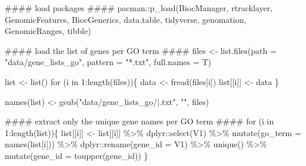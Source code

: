 \documentclass[
  letterpaper,
  DIV=11,
  numbers=noendperiod]{scrreprt}
\newenvironment{Shaded}{}{}
\newcommand{\AttributeTok}[1]{\textcolor[rgb]{0.84,0.23,0.29}{#1}}
\newcommand{\ControlFlowTok}[1]{\textcolor[rgb]{0.84,0.23,0.29}{#1}}
\newcommand{\DecValTok}[1]{\textcolor[rgb]{0.00,0.36,0.77}{#1}}
\newcommand{\DocumentationTok}[1]{\textcolor[rgb]{0.42,0.45,0.49}{#1}}
\newcommand{\FunctionTok}[1]{\textcolor[rgb]{0.44,0.26,0.76}{#1}}
\newcommand{\NormalTok}[1]{\textcolor[rgb]{0.14,0.16,0.18}{#1}}
\newcommand{\OtherTok}[1]{\textcolor[rgb]{0.44,0.26,0.76}{#1}}
\newcommand{\SpecialCharTok}[1]{\textcolor[rgb]{0.00,0.36,0.77}{#1}}
\newcommand{\StringTok}[1]{\textcolor[rgb]{0.01,0.18,0.38}{#1}}
\begin{document}
\begin{Shaded}
\begin{Highlighting}[]
\DocumentationTok{\#\#\#\# load packages \#\#\#\#}
\NormalTok{pacman}\SpecialCharTok{::}\FunctionTok{p\_load}\NormalTok{(BiocManager, rtracklayer, GenomicFeatures, BiocGenerics, data.table, tidyverse, genomation, GenomicRanges, tibble)}

\DocumentationTok{\#\#\#\# load the list of genes per GO term \#\#\#\#}
\NormalTok{files }\OtherTok{\textless{}{-}} \FunctionTok{list.files}\NormalTok{(}\AttributeTok{path =} \StringTok{"data/gene\_lists\_go"}\NormalTok{, }\AttributeTok{pattern =} \StringTok{"*.txt"}\NormalTok{, }\AttributeTok{full.names =}\NormalTok{ T)}

\NormalTok{list }\OtherTok{\textless{}{-}} \FunctionTok{list}\NormalTok{()}
\ControlFlowTok{for}\NormalTok{ (i }\ControlFlowTok{in} \DecValTok{1}\SpecialCharTok{:}\FunctionTok{length}\NormalTok{(files))\{}
\NormalTok{  data }\OtherTok{\textless{}{-}} \FunctionTok{fread}\NormalTok{(files[i])}
\NormalTok{  list[[i]] }\OtherTok{\textless{}{-}}\NormalTok{ data}
\NormalTok{\}}

\FunctionTok{names}\NormalTok{(list) }\OtherTok{\textless{}{-}} \FunctionTok{gsub}\NormalTok{(}\StringTok{"data/gene\_lists\_go/|.txt"}\NormalTok{, }\StringTok{""}\NormalTok{, files)}

\DocumentationTok{\#\#\#\# extract only the unique gene names per GO term \#\#\#\#}
\ControlFlowTok{for}\NormalTok{ (i }\ControlFlowTok{in} \DecValTok{1}\SpecialCharTok{:}\FunctionTok{length}\NormalTok{(list))\{}
\NormalTok{  list[[i]] }\OtherTok{\textless{}{-}}\NormalTok{ list[[i]] }\SpecialCharTok{\%\textgreater{}\%}\NormalTok{ dplyr}\SpecialCharTok{::}\FunctionTok{select}\NormalTok{(}\StringTok{\textasciigrave{}}\AttributeTok{V1}\StringTok{\textasciigrave{}}\NormalTok{) }\SpecialCharTok{\%\textgreater{}\%}
    \FunctionTok{mutate}\NormalTok{(}\AttributeTok{go\_term =} \FunctionTok{names}\NormalTok{(list[i])) }\SpecialCharTok{\%\textgreater{}\%}
\NormalTok{    dplyr}\SpecialCharTok{::}\FunctionTok{rename}\NormalTok{(}\AttributeTok{gene\_id =} \StringTok{\textasciigrave{}}\AttributeTok{V1}\StringTok{\textasciigrave{}}\NormalTok{) }\SpecialCharTok{\%\textgreater{}\%} \FunctionTok{unique}\NormalTok{() }\SpecialCharTok{\%\textgreater{}\%}
    \FunctionTok{mutate}\NormalTok{(}\AttributeTok{gene\_id =} \FunctionTok{toupper}\NormalTok{(gene\_id))}
\NormalTok{\}}


\end{Highlighting}
\end{Shaded}
\end{document}
